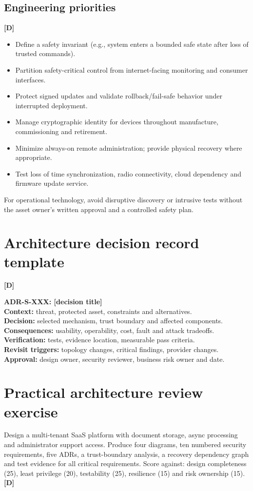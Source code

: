 \documentclass[10pt,letterpaper,oneside]{article}
\newcommand{\designed}{\textsf{\color{accent}\textbf{[D]}}}
\begin{document}
\subsection{Engineering priorities}\designed{}
\begin{itemize}
\item Define a safety invariant (e.g., system enters a bounded safe state after loss of trusted commands).
\item Partition safety-critical control from internet-facing monitoring and consumer interfaces.
\item Protect signed updates and validate rollback/fail-safe behavior under interrupted deployment.
\item Manage cryptographic identity for devices throughout manufacture, commissioning and retirement.
\item Minimize always-on remote administration; provide physical recovery where appropriate.
\item Test loss of time synchronization, radio connectivity, cloud dependency and firmware update service.
\end{itemize}
For operational technology, avoid disruptive discovery or intrusive tests without the asset owner's written approval and a controlled safety plan.

\section{Architecture decision record template}\designed{}
\begin{warningbox}
\textbf{ADR-S-XXX: [decision title]}\\
\textbf{Context:} threat, protected asset, constraints and alternatives.\\
\textbf{Decision:} selected mechanism, trust boundary and affected components.\\
\textbf{Consequences:} usability, operability, cost, fault and attack tradeoffs.\\
\textbf{Verification:} tests, evidence location, measurable pass criteria.\\
\textbf{Revisit triggers:} topology changes, critical findings, provider changes.\\
\textbf{Approval:} design owner, security reviewer, business risk owner and date.
\end{warningbox}

\section{Practical architecture review exercise}
Design a multi-tenant SaaS platform with document storage, async processing and administrator support access. Produce four diagrams, ten numbered security requirements, five ADRs, a trust-boundary analysis, a recovery dependency graph and test evidence for all critical requirements. Score against: design completeness (25), least privilege (20), testability (25), resilience (15) and risk ownership (15). \designed{}
\end{document}

